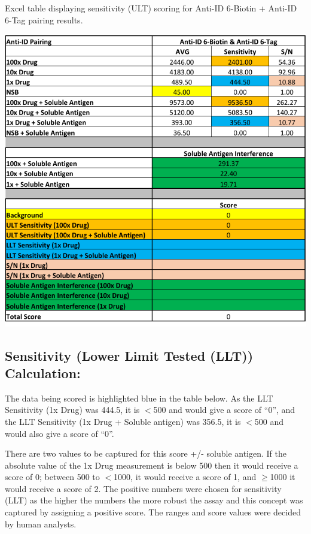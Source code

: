 \begin{table}[ht]
 \centering
 \caption{Excel table displaying sensitivity (ULT) scoring for Anti-ID 6-Biotin + Anti-ID 6-Tag pairing results.}
 \includegraphics{graphics/ch3/Table_4.pdf}
\end{table} 

\subsection*{Sensitivity (Lower Limit Tested (LLT)) Calculation:}
The data being scored is highlighted blue in the table below.  As the LLT Sensitivity (1x Drug) was 444.5, it is $<$500 and would give a score of “0”, and the LLT Sensitivity (1x Drug + Soluble antigen) was 356.5, it is $<$500 and would also give a score of “0”.

There are two values to be captured for this score +/- soluble antigen.  If the absolute value of the 1x Drug measurement is below 500 then it would receive a score of 0; between 500 to $<$1000, it would receive a score of 1, and $\geq$1000 it would receive a score of 2.  The positive numbers were chosen for sensitivity (LLT) as the higher the numbers the more robust the assay and this concept was captured by assigning a positive score.  The ranges and score values were decided by human analysts.

